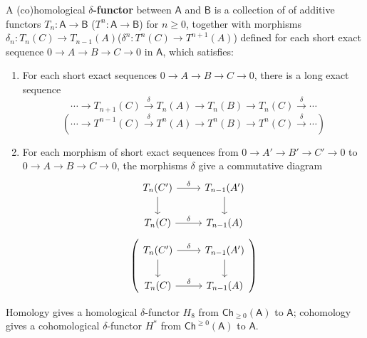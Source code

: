 \begin{defn}
A (co)homological \textbf{$\delta$-functor} between $\mathsf{A}$ and $\mathsf{B}$ is a collection of of additive functors $T_n:\mathsf{A}\rightarrow \mathsf{B}$ ($T^n:\mathsf{A}\rightarrow \mathsf{B}$) for $n\geq 0$, together with morphisms $\delta_n:T_n(C)\rightarrow T_{n-1}(A)$($\delta^n:T^n(C)\rightarrow T^{n+1}(A)$) defined for each short exact sequence $0\rightarrow A\rightarrow B\rightarrow C\rightarrow 0$ in $\mathsf{A}$, which satisfies:
\begin{enumerate}
\item For each short exact sequences $0\rightarrow A\rightarrow B\rightarrow C\rightarrow 0$, there is a long exact sequence
\begin{equation}
\cdots\rightarrow T_{n+1}(C)\xrightarrow{\delta} T_n(A)\rightarrow T_n(B)\rightarrow T_n(C)\xrightarrow{\delta}\cdots
\end{equation}
\begin{equation}
(\cdots\rightarrow T^{n-1}(C)\xrightarrow{\delta} T^n(A)\rightarrow T^n(B)\rightarrow T^n(C)\xrightarrow{\delta}\cdots)
\end{equation}
\item For each morphism of short exact sequences from $0\rightarrow A'\rightarrow B'\rightarrow C'\rightarrow 0$ to $0\rightarrow A\rightarrow B\rightarrow C\rightarrow 0$, the morphisms $\delta$ give a commutative diagram
\begin{equation}
\begin{tikzcd}
T_n(C')\arrow{r}{\delta} \arrow[d] & T_{n-1}(A')\arrow[d]\\
T_n(C)\arrow{r}{\delta} & T_{n-1}(A)
\end{tikzcd}
\end{equation}
\begin{equation}
\left(\begin{tikzcd}
T_n(C')\arrow{r}{\delta} \arrow[d] & T_{n-1}(A')\arrow[d]\\
T_n(C)\arrow{r}{\delta} & T_{n-1}(A)
\end{tikzcd}\right)
\end{equation}
\end{enumerate}
\end{defn}

\begin{exmp} Homology gives a homological $\delta$-functor $H_8$ from $\mathsf{Ch}_{\geq 0}(\mathsf{A})$ to $\mathsf{A}$; cohomology gives a cohomological $\delta$-functor $H^*$ from $\mathsf{Ch}^{\geq 0}(\mathsf{A})$ to $\mathsf{A}$.
\end{exmp}

